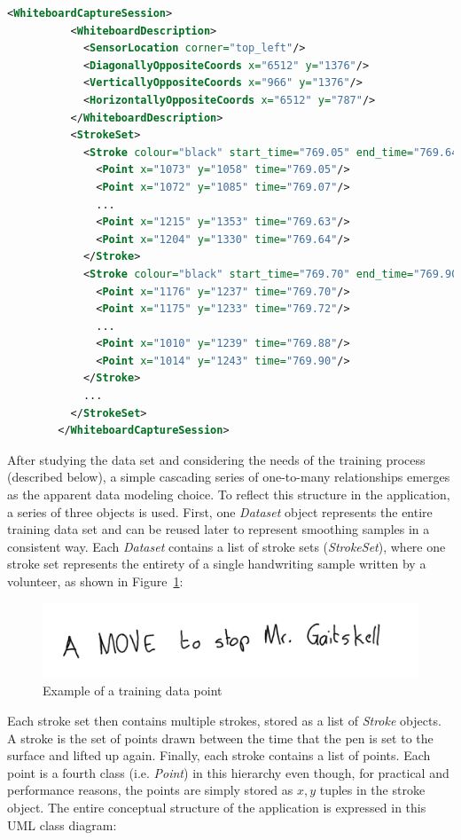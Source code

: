 \documentclass{article}
\begin{document}
    \begin{lstlisting}[language=XML]
        <WhiteboardCaptureSession>
          <WhiteboardDescription>
            <SensorLocation corner="top_left"/>
            <DiagonallyOppositeCoords x="6512" y="1376"/>
            <VerticallyOppositeCoords x="966" y="1376"/>
            <HorizontallyOppositeCoords x="6512" y="787"/>
          </WhiteboardDescription>
          <StrokeSet>
            <Stroke colour="black" start_time="769.05" end_time="769.64">
              <Point x="1073" y="1058" time="769.05"/>
              <Point x="1072" y="1085" time="769.07"/>
              ...
              <Point x="1215" y="1353" time="769.63"/>
              <Point x="1204" y="1330" time="769.64"/>
            </Stroke>
            <Stroke colour="black" start_time="769.70" end_time="769.90">
              <Point x="1176" y="1237" time="769.70"/>
              <Point x="1175" y="1233" time="769.72"/>
              ...
              <Point x="1010" y="1239" time="769.88"/>
              <Point x="1014" y="1243" time="769.90"/>
            </Stroke>
            ...
          </StrokeSet>
        </WhiteboardCaptureSession>
    \end{lstlisting}

After studying the data set and considering the needs of the training process (described below), a simple cascading series of one-to-many relationships emerges as the apparent data modeling choice. To reflect this structure in the application, a series of three objects is used. First, one \textit{Dataset} object represents the entire training data set and can be reused later to represent smoothing samples in a consistent way. Each \textit{Dataset} contains a list of stroke sets (\textit{StrokeSet}), where one stroke set represents the entirety of a single handwriting sample written by a volunteer, as shown in Figure~\ref{fig:example_handwriting_line}:

    \begin{figure}[hbt!]
        \includegraphics[width=12cm]{a01-000u-01}
        \centering
        \caption{Example of a training data point}
        \label{fig:example_handwriting_line}
    \end{figure}
    
Each stroke set then contains multiple strokes, stored as a list of \textit{Stroke} objects. A stroke is the set of points drawn between the time that the pen is set to the surface and lifted up again. Finally, each stroke contains a list of points. Each point is a fourth class (i.e. \textit{Point}) in this hierarchy even though, for practical and performance reasons, the points are simply stored as $x, y$ tuples in the stroke object. The entire conceptual structure of the application is expressed in this UML class diagram:
\end{document}
